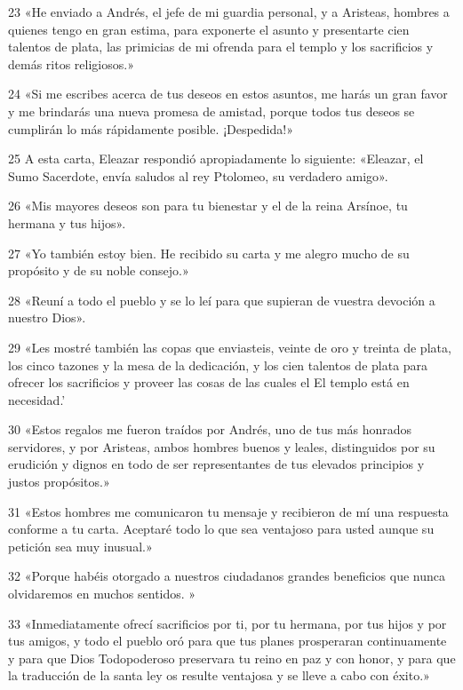 \par 23 «He enviado a Andrés, el jefe de mi guardia personal, y a Aristeas, hombres a quienes tengo en gran estima, para exponerte el asunto y presentarte cien talentos de plata, las primicias de mi ofrenda para el templo y los sacrificios y demás ritos religiosos.»

\par 24 «Si me escribes acerca de tus deseos en estos asuntos, me harás un gran favor y me brindarás una nueva promesa de amistad, porque todos tus deseos se cumplirán lo más rápidamente posible. ¡Despedida!»

\par 25 A esta carta, Eleazar respondió apropiadamente lo siguiente: «Eleazar, el Sumo Sacerdote, envía saludos al rey Ptolomeo, su verdadero amigo».

\par 26 «Mis mayores deseos son para tu bienestar y el de la reina Arsínoe, tu hermana y tus hijos».

\par 27 «Yo también estoy bien. He recibido su carta y me alegro mucho de su propósito y de su noble consejo.»

\par 28 «Reuní a todo el pueblo y se lo leí para que supieran de vuestra devoción a nuestro Dios».

\par 29 «Les mostré también las copas que enviasteis, veinte de oro y treinta de plata, los cinco tazones y la mesa de la dedicación, y los cien talentos de plata para ofrecer los sacrificios y proveer las cosas de las cuales el El templo está en necesidad.'

\par 30 «Estos regalos me fueron traídos por Andrés, uno de tus más honrados servidores, y por Aristeas, ambos hombres buenos y leales, distinguidos por su erudición y dignos en todo de ser representantes de tus elevados principios y justos propósitos.»

\par 31 «Estos hombres me comunicaron tu mensaje y recibieron de mí una respuesta conforme a tu carta. Aceptaré todo lo que sea ventajoso para usted aunque su petición sea muy inusual.»

\par 32 «Porque habéis otorgado a nuestros ciudadanos grandes beneficios que nunca olvidaremos en muchos sentidos.
»
\par 33 «Inmediatamente ofrecí sacrificios por ti, por tu hermana, por tus hijos y por tus amigos, y todo el pueblo oró para que tus planes prosperaran continuamente y para que Dios Todopoderoso preservara tu reino en paz y con honor, y para que la traducción de la santa ley os resulte ventajosa y se lleve a cabo con éxito.»

